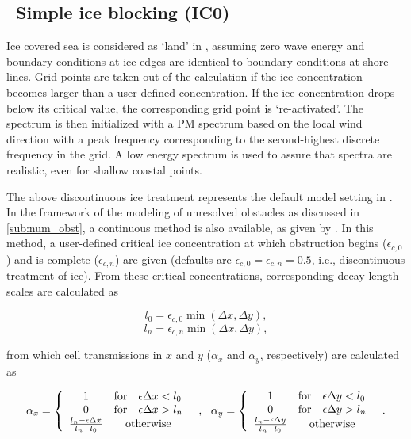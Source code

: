 \vssub
\subsection{~Simple ice blocking ({\code IC0})} \label{sub:num_ice}

\noindent
Ice covered sea is considered as `land' in \ws, assuming zero wave energy and
boundary conditions at ice edges are identical to boundary conditions at shore
lines. Grid points are taken out of the calculation if the ice concentration
becomes larger than a user-defined concentration. If the ice concentration
drops below its critical value, the corresponding grid point is
`re-activated'. The spectrum is then initialized with a PM spectrum based on
the local wind direction with a peak frequency corresponding to the
second-highest discrete frequency in the grid. A low energy spectrum is used to
assure that spectra are realistic, even for shallow coastal points.

The above discontinuous ice treatment represents the default model setting in
\ws. In the framework of the modeling of unresolved obstacles as discussed in
\para\ref{sub:num_obst}, a continuous method is also available, as given by
\cite{tol:OMOD03a}. In this method, a user-defined critical ice concentration
at which obstruction begins ($\epsilon_{c,0}$) and is complete
($\epsilon_{c,n}$) are given (defaults are $\epsilon_{c,0} = \epsilon_{c,n} =
0.5$, i.e., discontinuous treatment of ice). From these critical
concentrations, corresponding decay length scales are calculated as

\begin{equation}
l_0 = \epsilon_{c,0} \min ( \Delta x , \Delta y )
, \label{eq:l0}
\end{equation}
\begin{equation}
l_n = \epsilon_{c,n} \min ( \Delta x , \Delta y )
, \label{eq:ln}
\end{equation}

\noindent
from which cell transmissions in $x$ and $y$ ($\alpha_x$ and $\alpha_y$,
respectively) are calculated as

\begin{equation}
\alpha_x = \left \{ \begin{array}{ccl}
 1 & \mbox{for} & \epsilon \Delta x < l_0 \\
 0 & \mbox{for} & \epsilon \Delta x > l_n \\
\frac{l_n - \epsilon \Delta x}{l_n - l_0} & \multicolumn{2}{c}{\mbox{otherwise}} 
\end{array} \right .
\:\:\: , \:\:\:
\alpha_y = \left \{ \begin{array}{ccl}
 1 & \mbox{for} & \epsilon \Delta y < l_0 \\
 0 & \mbox{for} & \epsilon \Delta y > l_n \\
\frac{l_n - \epsilon \Delta y}{l_n - l_0} & \multicolumn{2}{c}{\mbox{otherwise}} 
\end{array} \right .
\:\:\: . \label{eq:ice_0} 
\end{equation}

